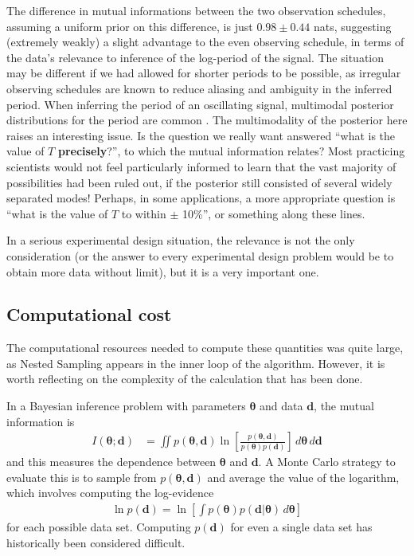 \documentclass[entropy,article,accept,oneauthor,pdftex,10pt,a4paper]{mdpi}
\renewcommand{\d}{\boldsymbol{d}}
\newcommand{\x}{\boldsymbol{\theta}}
\begin{document}
The difference in mutual informations between the two observation
schedules, assuming a uniform prior on this difference,
is just $0.98 \pm 0.44$ nats, suggesting (extremely weakly)
a slight advantage to the
even observing schedule, in terms of the data's relevance to inference
of the log-period of the signal. The situation may be different if we
had allowed for shorter periods to be possible, as irregular observing
schedules are known to reduce aliasing and ambiguity in the inferred period.
When inferring the period of an oscillating signal, multimodal posterior
distributions for the period are common \citep{gregoryTrimodal, exoplanet}.
The multimodality of the posterior here raises an interesting issue. Is
the question we really want answered ``what is the value of $T$
{\bf precisely}?'', to which the mutual information relates?
Most practicing scientists would not feel particularly informed to learn
that the vast majority of possibilities had been ruled out, if the
posterior still consisted of several widely separated modes!
Perhaps, in some applications, a more appropriate question is
``what is the value of $T$ to within $\pm$ 10\%'', or something along these
lines.

In a serious experimental design situation, the relevance is not the only
consideration (or the answer to every experimental design problem would
be to obtain more data without limit), but it is a very important one.

\subsection{Computational cost}

The computational resources needed to compute these quantities was quite large,
as Nested Sampling appears in the inner loop of the algorithm.
However, it is worth reflecting on the complexity of the calculation that
has been done.

In a Bayesian inference problem with parameters $\x$ and data $\d$, the
mutual information is
\begin{align}
I(\x; \d) &= \iint p(\x, \d)
                        \ln \left[\frac{p(\x, \d)}{p(\x)p(\d)}\right]
                        \, d\x \, d\d \label{eqn:mutual_info2}
\end{align}
and this measures the dependence between $\x$ and $\d$. A
Monte Carlo
strategy to evaluate this is to sample from $p(\x, \d)$ and average
the value of the logarithm, which involves computing the log-evidence
\begin{align}
\ln p(\d) = \ln\left[\int p(\x)p(\d | \x) \, d\x\right]
\end{align}
for each possible data set.
Computing $p(\d)$ for even a single
data set has historically been considered difficult.
\end{document}
